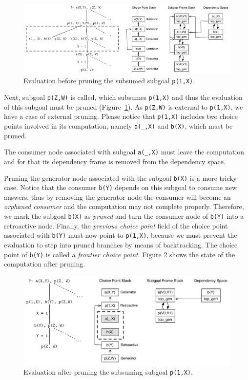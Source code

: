 \begin{figure}[ht]
  \centering
    \includegraphics[scale=0.5]{retro_example2.pdf}
  \caption{Evaluation before pruning the subsumed subgoal \texttt{p(1,X)}.}
  \label{fig:retro_eval2}
\end{figure}

Next, subgoal \texttt{p(Z,W)} is called, which subsumes \texttt{p(1,X)} and thus the evaluation of this subgoal
must be pruned (Figure~\ref{fig:retro_eval2}). As \texttt{p(Z,W)} is external to \texttt{p(1,X)}, we have
a case of external pruning. Please notice that \texttt{p(1,X)} includes two choice
points involved in its computation, namely \texttt{a(\_,X)} and \texttt{b(X)}, which must be pruned.

The consumer node associated with subgoal \texttt{a(\_,X)} must leave the computation and for that
its dependency frame is removed from the dependency space.

Pruning the generator node associated with the subgoal \texttt{b(X)} is a more tricky case. Notice that
the consumer \texttt{b(Y)} depends on this subgoal to consume new answers, thus by removing the generator node
the consumer will become an \textit{orphaned consumer} and the computation may not complete properly.
Therefore, we mark the subgoal \texttt{b(X)} as \textit{pruned} and turn the consumer node of \texttt{b(Y)}
into a retroactive node. Finally, the \textit{previous choice point} field of the choice point associated
with \texttt{b(Y)} must now point to \texttt{p(1,X)}, because we must prevent the evaluation to step into
pruned branches by means of backtracking. The choice point of \texttt{b(Y)} is called a
\textit{frontier choice point}. Figure \ref{fig:retro_eval3} shows the state of the computation after pruning.

\begin{figure}[ht]
  \centering
    \includegraphics[scale=0.5]{retro_example3.pdf}
  \caption{Evaluation after pruning the subsuming subgoal \texttt{p(1,X)}.}
  \label{fig:retro_eval3}
\end{figure}

